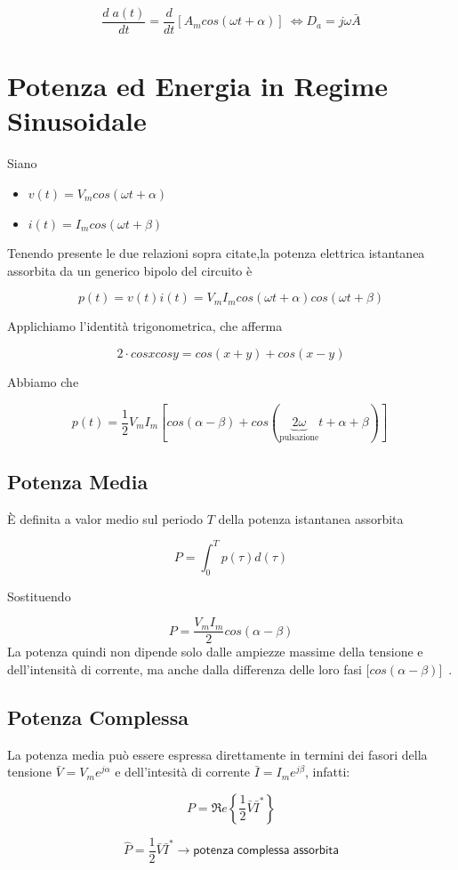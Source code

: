 \documentclass[a4paper]{report}
\begin{document}
\[
\dfrac {d\;a(t)}{dt}=\dfrac{d}{dt}[A_mcos(\omega
  t+\alpha)]\ \Longleftrightarrow D_a=j\omega \bar{A}
\]

\section{Potenza ed Energia in Regime Sinusoidale}

Siano
\begin{itemize}
\item $v(t)=V_mcos(\omega t+\alpha)$
\item $i(t)=I_mcos(\omega t+\beta)$
\end{itemize}

Tenendo presente le due relazioni sopra citate,la potenza elettrica
istantanea assorbita da un generico bipolo del circuito \`e

\[
p(t)=v(t)i(t)=V_mI_mcos(\omega t+\alpha)cos(\omega t+\beta)
\]

Applichiamo l'identit\`a trigonometrica, che afferma

\[
2\cdot cosxcosy = cos(x+y)+cos(x-y)
\]

Abbiamo che

\[
p(t)=\dfrac{1}{2}V_mI_m[cos(\alpha-\beta)+cos(\underbrace{2\omega}_\text
  {pulsazione} t+\alpha+\beta)]\
\]

\subsection{Potenza Media}
\`E definita a valor medio sul periodo $T$ della potenza istantanea
assorbita

\[
P=\int_0^T p(\tau) d(\tau)
\]

Sostituendo

\[
P=\dfrac{V_mI_m}{2}cos(\alpha -\beta)
\]
La potenza quindi non dipende solo dalle ampiezze massime della
tensione e dell'intensit\`a di corrente, ma anche dalla differenza
delle loro fasi [$cos(\alpha -\beta)$]\ .


\subsection{Potenza Complessa}
La potenza media pu\`o essere espressa direttamente in termini dei
fasori della tensione $\bar V=V_me^{j\alpha}$ e dell'intesit\`a di
corrente $\bar I=I_me^{j\beta}$, infatti:

\[
P=\Re e\left\{\dfrac{1}{2}\bar{V}\bar{I}^*\right\}
\]

\[
\widehat P=\dfrac{1}{2} \bar{V}\bar{I}^* \longrightarrow \mathsf{potenza\;
  complessa\; assorbita}
\]
\end{document}
